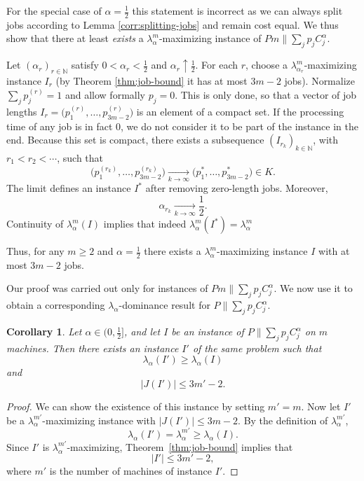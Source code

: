 \documentclass[%
english, titlepage=false %
]{./tum-templates/book/tumbook}
\newtheorem{corollary}{Corollary}
\newcommand{\Problem}{P\!\parallel\!\sum_j p_j C^{\alpha}_j}
\begin{document}
For the special case of $\alpha=\frac12$ this statement is incorrect as 
we can always split jobs according to Lemma \ref{corr:splitting-jobs} and remain 
cost equal. 
We thus show that there at least \emph{exists} a $\lambda_\alpha^m$-maximizing 
instance of $Pm\!\parallel\!\sum_j p_j C_j^\alpha$.\medskip

Let $(\alpha_r)_{r\in\mathbb N}$ satisfy
$0<\alpha_r<\frac12$ and $\alpha_r\uparrow\frac12$.
For each $r$, choose a $\lambda_{\alpha_r}^m$-maximizing
instance $I_r$ (by Theorem \ref{thm:job-bound} it has at most $3m-2$ jobs). Normalize
$\sum_j p_j^{(r)}=1$ and allow formally $p_j=0$. This is only done, so that 
a vector of job lengths $I_r=\bigl(p_1^{(r)},\ldots,p_{3m-2}^{(r)}\bigr)$ is an element of a compact set.
If the processing time of any job is in fact $0$, we do not consider it to be part of the instance in the end. 
Because this set is compact, there exists a subsequence
$(I_{r_k})_{k\in\mathbb N}$, with $r_1<r_2<\cdots$, such that
\[
\bigl(p_1^{(r_k)},\ldots,p_{3m-2}^{(r_k)}\bigr)
\xrightarrow[k\to\infty]{}
\bigl(p_1^*,\ldots,p_{3m-2}^*\bigr)\in K.
\]
The limit defines an instance $I^*$ after
removing zero-length jobs. Moreover,
\[
\alpha_{r_k}\xrightarrow[k\to\infty]{}\frac12.
\]
Continuity of $\lambda^m_{\alpha}(I)$ implies that indeed $\lambda^m_{\alpha}(I^*) = \lambda^m_{\alpha}$

Thus, for any $m\ge2$ and $\alpha=\frac12$ there exists a $\lambda^m_{\alpha}$-maximizing
instance $I$ with at most $3m-2$ jobs.  

Our proof was carried out only for instances of $Pm\!\parallel\!\sum_{j}p_j C^{\alpha}_j$.
We now use it to obtain a corresponding
$\lambda_\alpha$-dominance result for $\Problem$.

\begin{corollary}
Let $\alpha\in\Big(0,\frac12\Big]$, and let $I$ be an instance of
$\Problem$ on $m$ machines. Then there exists an instance $I'$ of the
same problem such that
\[
    \lambda_\alpha(I')\geq\lambda_\alpha(I)
\]
and
\[
    |J(I')|\leq3m'-2.
\]
\end{corollary}

\begin{proof}
We can show the existence of this instance by setting $m'=m$.
Now let $I'$ be a $\lambda_\alpha^{m'}$-maximizing instance with $|J(I')| \le 3m-2$. By the
definition of $\lambda_\alpha^{m'}$,
\[
    \lambda_\alpha(I')
    =\lambda_\alpha^{m'}
    \geq\lambda_\alpha(I).
\]
Since $I'$ is $\lambda_\alpha^{m'}$-maximizing,
Theorem~\ref{thm:job-bound} implies that
\[
    |I'|\leq3m'-2,
\]
where $m'$ is the number of machines of instance $I'$.
\end{proof}
\end{document}
